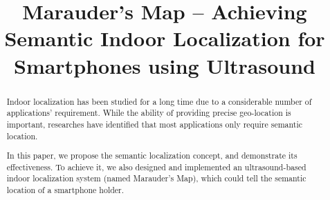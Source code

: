 \documentclass[conference, 10pt]{IEEEtran}
\begin{document}
\title{Marauder's Map -- Achieving Semantic Indoor Localization for Smartphones using Ultrasound}

\author{
\and
{}
\and
{}
}

\maketitle

\begin{abstract}
Indoor localization has been studied for a long time due to a considerable number of applications' requirement. While the ability of providing precise geo-location is important, researches have identified that most applications only require semantic location.

In this paper, we propose the semantic localization concept, and demonstrate its effectiveness. To achieve it, we also designed and implemented an ultrasound-based indoor localization system (named Marauder's Map), which could tell the semantic location of a smartphone holder.
\end{abstract}









\end{document}
